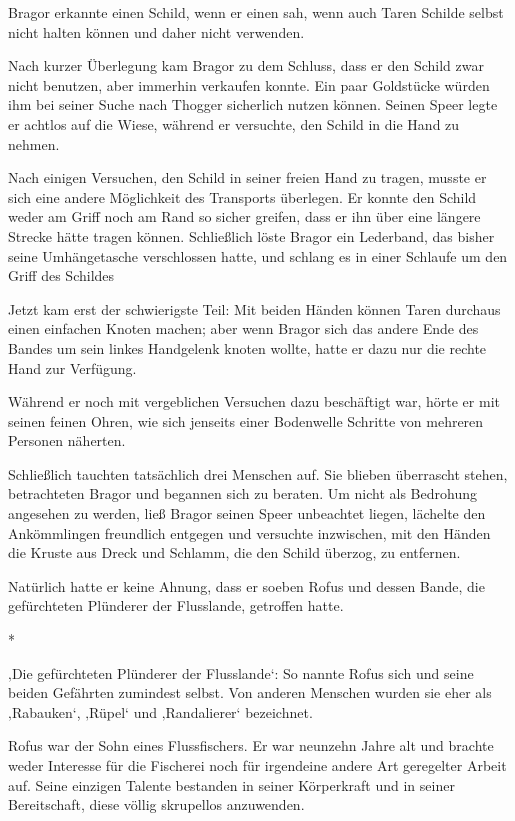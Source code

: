 \documentclass[10pt, a4paper, oneside]{book}
\begin{document}
\begin{multicols}{2}
Bragor erkannte einen Schild, wenn er einen sah, wenn auch Taren Schilde selbst nicht halten können und daher nicht verwenden. 

Nach kurzer Überlegung kam Bragor zu dem Schluss, dass er den Schild zwar nicht benutzen, aber immerhin verkaufen konnte. Ein paar Goldstücke würden ihm bei seiner Suche nach Thogger sicherlich nutzen können. Seinen Speer legte er achtlos auf die Wiese, während er versuchte, den Schild in die Hand zu nehmen. 

Nach einigen Versuchen, den Schild in seiner freien Hand zu tragen, musste er sich eine andere Möglichkeit des Transports überlegen. Er konnte den Schild weder am Griff noch am Rand so sicher greifen, dass er ihn über eine längere Strecke hätte tragen können. Schließlich löste Bragor ein Lederband, das bisher seine Umhängetasche verschlossen hatte, und schlang es in einer Schlaufe um den Griff des Schildes 

Jetzt kam erst der schwierigste Teil: Mit beiden Händen können Taren durchaus einen einfachen Knoten machen; aber wenn Bragor sich das andere Ende des Bandes um sein linkes Handgelenk knoten wollte, hatte er dazu nur die rechte Hand zur Verfügung. 

Während er noch mit vergeblichen Versuchen dazu beschäftigt war, hörte er mit seinen feinen Ohren, wie sich jenseits einer Bodenwelle Schritte von mehreren Personen näherten. 

Schließlich tauchten tatsächlich drei Menschen auf. Sie blieben überrascht stehen, betrachteten Bragor und begannen sich zu beraten. Um nicht als Bedrohung angesehen zu werden, ließ Bragor seinen Speer unbeachtet liegen, lächelte den Ankömmlingen freundlich entgegen und versuchte inzwischen, mit den Händen die Kruste aus Dreck und Schlamm, die den Schild überzog, zu entfernen. 

Natürlich hatte er keine Ahnung, dass er soeben Rofus und dessen Bande, die gefürchteten Plünderer der Flusslande, getroffen hatte. 

\begin{center}
    * 
\end{center}

‚Die gefürchteten Plünderer der Flusslande‘: So nannte Rofus sich und seine beiden Gefährten zumindest selbst. Von anderen Menschen wurden sie eher als ‚Rabauken‘, ‚Rüpel‘ und ‚Randalierer‘ bezeichnet. 

Rofus war der Sohn eines Flussfischers. Er war neunzehn Jahre alt und brachte weder Interesse für die Fischerei noch für irgendeine andere Art geregelter Arbeit auf. Seine einzigen Talente bestanden in seiner Körperkraft und in seiner Bereitschaft, diese völlig skrupellos anzuwenden. 


\end{multicols}
\end{document}

